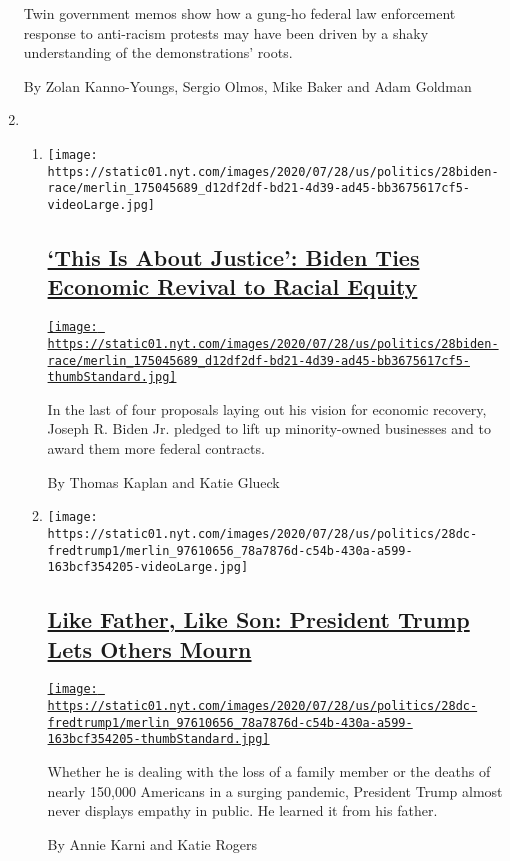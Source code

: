 \begin{enumerate}
  Twin government memos show how a gung-ho federal law enforcement
  response to anti-racism protests may have been driven by a shaky
  understanding of the demonstrations' roots.

  By Zolan Kanno-Youngs, Sergio Olmos, Mike Baker and Adam Goldman
\item
  \begin{enumerate}
  \def\labelenumii{\arabic{enumii}.}
  \item
    \texttt{[image: https://static01.nyt.com/images/2020/07/28/us/politics/28biden-race/merlin\_175045689\_d12df2df-bd21-4d39-ad45-bb3675617cf5-videoLarge.jpg]}

    \hypertarget{this-is-about-justice-biden-ties-economic-revival-to-racial-equity}{%
    \subsection{\texorpdfstring{\href{/2020/07/28/us/politics/joe-biden-racial-justice-economy-plan.html}{`This
    Is About Justice': Biden Ties Economic Revival to Racial
    Equity}}{`This Is About Justice': Biden Ties Economic Revival to Racial Equity}}\label{this-is-about-justice-biden-ties-economic-revival-to-racial-equity}}

    \href{/2020/07/28/us/politics/joe-biden-racial-justice-economy-plan.html}{\texttt{[image: https://static01.nyt.com/images/2020/07/28/us/politics/28biden-race/merlin\_175045689\_d12df2df-bd21-4d39-ad45-bb3675617cf5-thumbStandard.jpg]}}

    In the last of four proposals laying out his vision for economic
    recovery, Joseph R. Biden Jr. pledged to lift up minority-owned
    businesses and to award them more federal contracts.

    By Thomas Kaplan and Katie Glueck
  \item
    \texttt{[image: https://static01.nyt.com/images/2020/07/28/us/politics/28dc-fredtrump1/merlin\_97610656\_78a7876d-c54b-430a-a599-163bcf354205-videoLarge.jpg]}

    \hypertarget{like-father-like-son-president-trump-lets-others-mourn}{%
    \subsection{\texorpdfstring{\href{/2020/07/28/us/politics/donald-fred-trump.html}{Like
    Father, Like Son: President Trump Lets Others
    Mourn}}{Like Father, Like Son: President Trump Lets Others Mourn}}\label{like-father-like-son-president-trump-lets-others-mourn}}

    \href{/2020/07/28/us/politics/donald-fred-trump.html}{\texttt{[image: https://static01.nyt.com/images/2020/07/28/us/politics/28dc-fredtrump1/merlin\_97610656\_78a7876d-c54b-430a-a599-163bcf354205-thumbStandard.jpg]}}

    Whether he is dealing with the loss of a family member or the deaths
    of nearly 150,000 Americans in a surging pandemic, President Trump
    almost never displays empathy in public. He learned it from his
    father.

    By Annie Karni and Katie Rogers
  \end{enumerate}
\end{enumerate}

